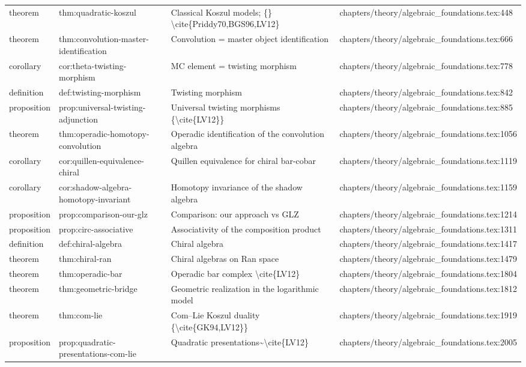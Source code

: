 \documentclass[11pt]{article}
\begin{document}
\begin{longtable}{L{0.10\textwidth}L{0.26\textwidth}L{0.42\textwidth}L{0.22\textwidth}}
theorem & thm:quadratic-koszul & Classical Koszul models; \{\} \textbackslash{}cite\{Priddy70,BGS96,LV12\} & chapters/theory/algebraic\_foundations.tex:448\\
theorem & thm:convolution-master-identification & Convolution = master object identification & chapters/theory/algebraic\_foundations.tex:666\\
corollary & cor:theta-twisting-morphism & MC element = twisting morphism & chapters/theory/algebraic\_foundations.tex:778\\
definition & def:twisting-morphism & Twisting morphism & chapters/theory/algebraic\_foundations.tex:842\\
proposition & prop:universal-twisting-adjunction & Universal twisting morphisms \{\textbackslash{}cite\{LV12\}\} & chapters/theory/algebraic\_foundations.tex:885\\
theorem & thm:operadic-homotopy-convolution & Operadic identification of the convolution algebra & chapters/theory/algebraic\_foundations.tex:1056\\
corollary & cor:quillen-equivalence-chiral & Quillen equivalence for chiral bar-cobar & chapters/theory/algebraic\_foundations.tex:1119\\
corollary & cor:shadow-algebra-homotopy-invariant & Homotopy invariance of the shadow algebra & chapters/theory/algebraic\_foundations.tex:1159\\
proposition & prop:comparison-our-glz & Comparison: our approach vs GLZ & chapters/theory/algebraic\_foundations.tex:1214\\
proposition & prop:circ-associative & Associativity of the composition product & chapters/theory/algebraic\_foundations.tex:1311\\
definition & def:chiral-algebra & Chiral algebra & chapters/theory/algebraic\_foundations.tex:1417\\
theorem & thm:chiral-ran & Chiral algebras on Ran space & chapters/theory/algebraic\_foundations.tex:1479\\
theorem & thm:operadic-bar & Operadic bar complex \textbackslash{}cite\{LV12\} & chapters/theory/algebraic\_foundations.tex:1804\\
theorem & thm:geometric-bridge & Geometric realization in the logarithmic model & chapters/theory/algebraic\_foundations.tex:1812\\
theorem & thm:com-lie & Com--Lie Koszul duality \{\textbackslash{}cite\{GK94,LV12\}\} & chapters/theory/algebraic\_foundations.tex:1919\\
proposition & prop:quadratic-presentations-com-lie & Quadratic presentations\textasciitilde{}\textbackslash{}cite\{LV12\} & chapters/theory/algebraic\_foundations.tex:2005\\

\end{longtable}
\end{document}
